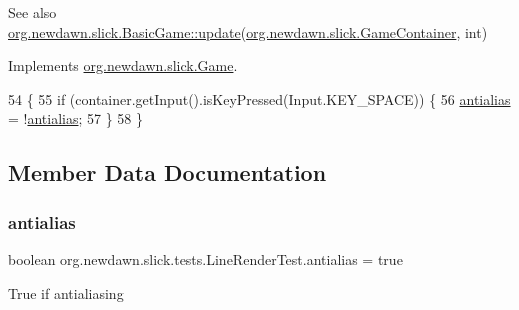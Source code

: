 \begin{DoxySeeAlso}{See also}
\mbox{\hyperlink{classorg_1_1newdawn_1_1slick_1_1_basic_game_acfe6fa05aef83bff1631af91a3e4bd20}{org.\+newdawn.\+slick.\+Basic\+Game\+::update}}(\mbox{\hyperlink{classorg_1_1newdawn_1_1slick_1_1_game_container}{org.\+newdawn.\+slick.\+Game\+Container}}, int) 
\end{DoxySeeAlso}


Implements \mbox{\hyperlink{interfaceorg_1_1newdawn_1_1slick_1_1_game_ab07b2e9463ee4631620dde0de25bdee8}{org.\+newdawn.\+slick.\+Game}}.


\begin{DoxyCode}
54                                                                                  \{
55         \textcolor{keywordflow}{if} (container.getInput().isKeyPressed(Input.KEY\_SPACE)) \{
56             \mbox{\hyperlink{classorg_1_1newdawn_1_1slick_1_1tests_1_1_line_render_test_acf6b3869ee9b841334e44f56f15dfef0}{antialias}} = !\mbox{\hyperlink{classorg_1_1newdawn_1_1slick_1_1tests_1_1_line_render_test_acf6b3869ee9b841334e44f56f15dfef0}{antialias}};
57         \}
58     \}
\end{DoxyCode}


\subsection{Member Data Documentation}
\mbox{\label{classorg_1_1newdawn_1_1slick_1_1tests_1_1_line_render_test_acf6b3869ee9b841334e44f56f15dfef0}} 
\subsubsection{\texorpdfstring{antialias}{antialias}}
{\footnotesize\ttfamily boolean org.\+newdawn.\+slick.\+tests.\+Line\+Render\+Test.\+antialias = true\hspace{0.3cm}{\ttfamily [private]}}

True if antialiasing \mbox{\label{classorg_1_1newdawn_1_1slick_1_1tests_1_1_line_render_test_a1585e6e77bca69047a515e8f2cd9d650}} 
